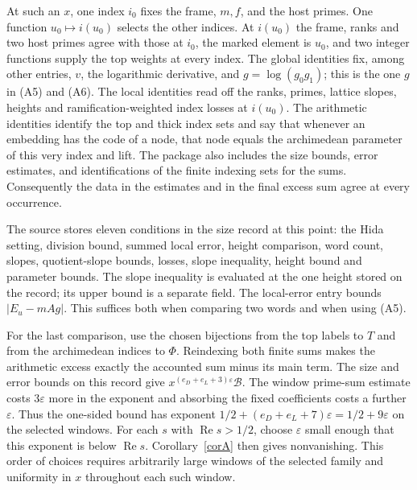 At such an $x$, one index $i_0$ fixes the frame, $m,f$, and the host
primes. One function $u_0\mapsto i(u_0)$ selects the other indices.
At $i(u_0)$ the frame, ranks and two host primes agree with those at
$i_0$, the marked element is $u_0$, and two integer functions supply
the top weights at every index. The global identities fix, among
other entries, $v$, the logarithmic derivative, and
$g=\log(g_0g_1)$; this is the one $g$ in (A5) and (A6).
The local identities read off the ranks, primes, lattice slopes,
heights and ramification-weighted index losses at $i(u_0)$.
The arithmetic identities identify the top and thick index sets and say
that whenever an embedding has the code of a node, that node equals
the archimedean parameter of this very index and lift. The package
also includes the size bounds, error estimates, and identifications
of the finite indexing sets for the sums. Consequently the data in
the estimates and in the final excess sum agree at every occurrence.

The source stores eleven conditions in the size record at this point:
the Hida setting, division bound, summed local error, height comparison,
word count, slopes, quotient-slope bounds, losses, slope inequality,
height bound and parameter bounds. The slope inequality is evaluated at
the one height stored on the record; its upper bound is a separate field.
The local-error entry bounds $|E_u-mAg|$. This suffices both when
comparing two words and when using (A5).

For the last comparison, use the chosen bijections from the top labels
to $T$ and from the archimedean indices to $\Phi$. Reindexing both
finite sums makes the arithmetic excess exactly the accounted sum
minus its main term. The size and error bounds on this record give
$x^{(e_D+e_L+3)\varepsilon}\mathcal B$. The window prime-sum estimate
costs $3\varepsilon$ more in the exponent and absorbing the fixed
coefficients costs a further $\varepsilon$. Thus the one-sided bound
has exponent $1/2+(e_D+e_L+7)\varepsilon=1/2+9\varepsilon$
on the selected windows. For each $s$ with $\operatorname{Re}s>1/2$,
choose $\varepsilon$ small enough that this exponent is below
$\operatorname{Re}s$. Corollary~\ref{corA} then gives nonvanishing.
This order of choices requires arbitrarily large windows of the selected
family and uniformity in $x$ throughout each such window.

